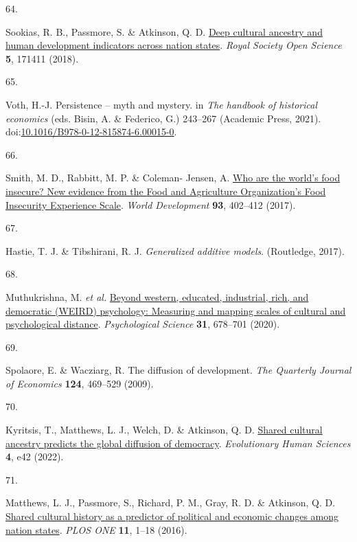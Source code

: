 \documentclass[
  man,floatsintext]{apa6}
\newlength{\cslhangindent}
\newlength{\csllabelwidth}
\newlength{\cslentryspacingunit} %
\newenvironment{CSLReferences}[2] %
 {%
  \setlength{\parindent}{0pt}
  \ifodd #1
  \let\oldpar\par
  \def\par{\hangindent=\cslhangindent\oldpar}
  \fi
  \setlength{\parskip}{#2\cslentryspacingunit}
 }%
 {}
\newcommand{\CSLLeftMargin}[1]{\parbox[t]{\csllabelwidth}{#1}}
\newcommand{\CSLRightInline}[1]{\parbox[t]{\linewidth - \csllabelwidth}{#1}\break}
\begin{document}
\begin{CSLReferences}{0}{0}
\leavevmode{}%
\CSLLeftMargin{64. }%
\CSLRightInline{Sookias, R. B., Passmore, S. \& Atkinson, Q. D. \href{https://doi.org/10.1098/rsos.171411}{Deep cultural ancestry and human development indicators across nation states}. \emph{Royal Society Open Science} \textbf{5}, 171411 (2018).}

\leavevmode{}%
\CSLLeftMargin{65. }%
\CSLRightInline{Voth, H.-J. Persistence -- myth and mystery. in \emph{The handbook of historical economics} (eds. Bisin, A. \& Federico, G.) 243--267 (Academic Press, 2021). doi:\href{https://doi.org/10.1016/B978-0-12-815874-6.00015-0}{10.1016/B978-0-12-815874-6.00015-0}.}

\leavevmode{}%
\CSLLeftMargin{66. }%
\CSLRightInline{Smith, M. D., Rabbitt, M. P. \& Coleman- Jensen, A. \href{https://doi.org/10.1016/j.worlddev.2017.01.006}{Who are the world's food insecure? New evidence from the {F}ood and {A}griculture {O}rganization's {F}ood {I}nsecurity {E}xperience {S}cale}. \emph{World Development} \textbf{93}, 402--412 (2017).}

\leavevmode{}%
\CSLLeftMargin{67. }%
\CSLRightInline{Hastie, T. J. \& Tibshirani, R. J. \emph{Generalized additive models}. (Routledge, 2017).}

\leavevmode{}%
\CSLLeftMargin{68. }%
\CSLRightInline{Muthukrishna, M. \emph{et al.} \href{https://doi.org/10.1177/0956797620916782}{Beyond western, educated, industrial, rich, and democratic (WEIRD) psychology: Measuring and mapping scales of cultural and psychological distance}. \emph{Psychological Science} \textbf{31}, 678--701 (2020).}

\leavevmode{}%
\CSLLeftMargin{69. }%
\CSLRightInline{Spolaore, E. \& Wacziarg, R. The diffusion of development. \emph{The Quarterly Journal of Economics} \textbf{124}, 469--529 (2009).}

\leavevmode{}%
\CSLLeftMargin{70. }%
\CSLRightInline{Kyritsis, T., Matthews, L. J., Welch, D. \& Atkinson, Q. D. \href{https://doi.org/10.1017/ehs.2022.40}{Shared cultural ancestry predicts the global diffusion of democracy}. \emph{Evolutionary Human Sciences} \textbf{4}, e42 (2022).}

\leavevmode{}%
\CSLLeftMargin{71. }%
\CSLRightInline{Matthews, L. J., Passmore, S., Richard, P. M., Gray, R. D. \& Atkinson, Q. D. \href{https://doi.org/10.1371/journal.pone.0152979}{Shared cultural history as a predictor of political and economic changes among nation states}. \emph{PLOS ONE} \textbf{11}, 1--18 (2016).}


\end{CSLReferences}
\end{document}
